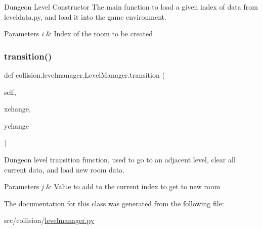 Dungeon Level Constructor  The main function to load a given index of data from leveldata.\+py, and load it into the game environment. 


\begin{DoxyParams}{Parameters}
{\em i} & Index of the room to be created \\
\hline
\end{DoxyParams}
\mbox{\label{classcollision_1_1levelmanager_1_1_level_manager_ac73f0ef69a1d1ff85a906a68cb1e2c86}} 
\subsubsection{\texorpdfstring{transition()}{transition()}}
{\footnotesize\ttfamily def collision.\+levelmanager.\+Level\+Manager.\+transition (\begin{DoxyParamCaption}\item[{}]{self,  }\item[{}]{xchange,  }\item[{}]{ychange }\end{DoxyParamCaption})}



Dungeon level transition function, used to go to an adjacent level, clear all current data, and load new room data. 


\begin{DoxyParams}{Parameters}
{\em j} & Value to add to the current index to get to new room \\
\hline
\end{DoxyParams}


The documentation for this class was generated from the following file\+:\begin{DoxyCompactItemize}
\item 
src/collision/\hyperlink{levelmanager_8py}{levelmanager.\+py}\end{DoxyCompactItemize}
